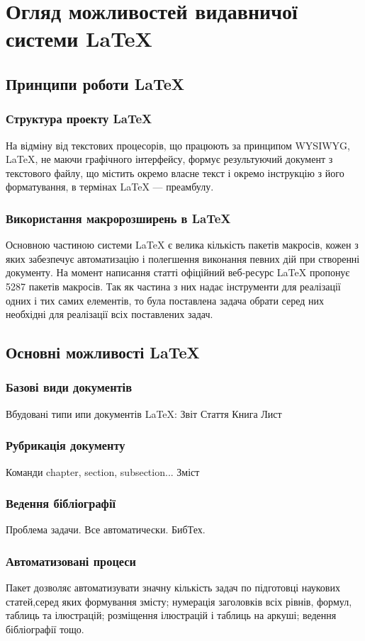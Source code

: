\chapter{Огляд можливостей видавничої системи \LaTeX{} } \label{chapter:first}
%
%
%
%
%
\section{Принципи роботи \LaTeX{}}
%
%
\subsection{Структура проекту \LaTeX{}}
На   відміну   від   текстових   процесорів,   що   працюють   за   принципом WYSIWYG,  LaTeX,  не  маючи  графічного  інтерфейсу,  формує  результуючий документ з текстового файлу, що містить окремо власне текст і окремо інструкцію з його форматування, в термінах 
LaTeX --- преамбулу.
%
%
\subsection{Використання макророзширень в \LaTeX{}}
Основною  частиною  системи  LaTeX  є  велика  кількість  пакетів  макросів, кожен  з  яких  забезпечує  автоматизацію  і  полегшення  виконання  певних  дій  при створенні  документу.  На  момент  написання  статті  офіційний  веб-ресурс  LaTeX пропонує  5287  пакетів  макросів.  Так як  частина  з  них  надає  інструменти  для реалізації  одних  і  тих  самих  елементів,  то  була  поставлена  задача  обрати  серед них  необхідні  для  реалізації  всіх  поставлених  задач. 
%
%
%
%
%
\section{Основні можливості \LaTeX{}}
%
%
\subsection{Базові види документів}
Вбудовані типи ипи документів LaTeX:
Звіт
Стаття
Книга
Лист
%
%
\subsection{Рубрикація документу}
Команди chapter, section, subsection...
Зміст
%
%
\subsection{Ведення бібліографії}
Проблема задачи.
Все автоматически.
БибТех.
%
%
\subsection{Автоматизовані процеси}
Пакет   дозволяє   автоматизувати   значну   кількість  задач  по  підготовці наукових статей,серед яких формування змісту; нумерація заголовків всіх рівнів, формул,  таблиць  та  ілюстрацій;  розміщення  ілюстрацій  і  таблиць  на  аркуші; ведення бібліографії тощо.
